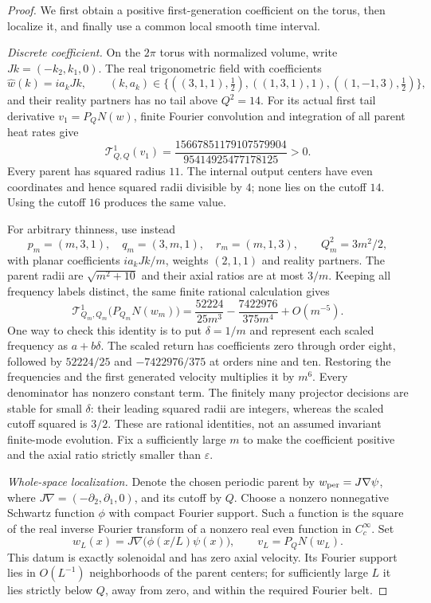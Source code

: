 \documentclass[11pt]{article}
\begin{document}
\begin{proof}
We first obtain a positive first-generation coefficient on the torus,
then localize it, and finally use a common local smooth time interval.

\emph{Discrete coefficient.}
On the $2\pi$ torus with normalized volume, write
$Jk=(-k_2,k_1,0)$. The real trigonometric field with coefficients
\[
 \widehat w(k)=i a_kJk,\qquad
 (k,a_k)\in\{((3,1,1),\tfrac12),((1,3,1),1),
                    ((1,-1,3),\tfrac12)\},
\]
and their reality partners has no tail above $Q^2=14$.
For its actual first tail derivative $v_1=P_QN(w)$, finite Fourier
convolution and integration of all parent heat rates give
\begin{equation}\label{eq:positivechild}
 \mathcal T_{Q,Q}^1(v_1)
 =\frac{15667851179107579904}{95414925477178125}>0.
\end{equation}
Every parent has squared radius $11$. The internal output centers have
even coordinates and hence squared radii divisible by $4$; none lies
on the cutoff $14$. Using the cutoff $16$ produces the same value.

For arbitrary thinness, use instead
\[
 p_m=(m,3,1),\quad q_m=(3,m,1),\quad r_m=(m,1,3),
 \qquad Q_m^2=3m^2/2,
\]
with planar coefficients $i a_kJk/m$, weights $(2,1,1)$ and reality
partners. The parent radii are $\sqrt{m^2+10}$ and their axial ratios
are at most $3/m$. Keeping all frequency labels distinct, the same
finite rational calculation gives
\begin{equation}\label{eq:thinpositivechild}
 \mathcal T_{Q_m,Q_m}^1\big(P_{Q_m}N(w_m)\big)
 =\frac{52224}{25m^3}-\frac{7422976}{375m^4}+O(m^{-5}).
\end{equation}
One way to check this identity is to put $\delta=1/m$ and represent
each scaled frequency as $a+b\delta$. The scaled return has coefficients
zero through order eight, followed by $52224/25$ and $-7422976/375$ at
orders nine and ten. Restoring the frequencies and the first generated
velocity multiplies it by $m^6$. Every denominator has nonzero constant
term. The finitely many projector decisions are stable for small
$\delta$: their leading squared radii are integers, whereas the scaled
cutoff squared is $3/2$. These are rational identities, not an assumed
invariant finite-mode evolution. Fix a sufficiently large $m$ to make
the coefficient positive and the axial ratio strictly smaller than
$\varepsilon$.

\emph{Whole-space localization.}
Denote the chosen periodic parent by $w_{\rm per}=J\nabla\psi$, where
$J\nabla=(-\partial_2,\partial_1,0)$, and its cutoff by $Q$.
Choose a nonzero nonnegative Schwartz function $\phi$ with compact
Fourier support. Such a function is the square of the real inverse
Fourier transform of a nonzero real even function in $C_c^\infty$.
Set
\[
 w_L(x)=J\nabla\big(\phi(x/L)\psi(x)\big),\qquad
 v_L=P_QN(w_L).
\]
This datum is exactly solenoidal and has zero axial velocity. Its
Fourier support lies in $O(L^{-1})$ neighborhoods of the parent centers;
for sufficiently large $L$ it lies strictly below $Q$, away from zero,
and within the required Fourier belt.


\end{proof}
\end{document}
